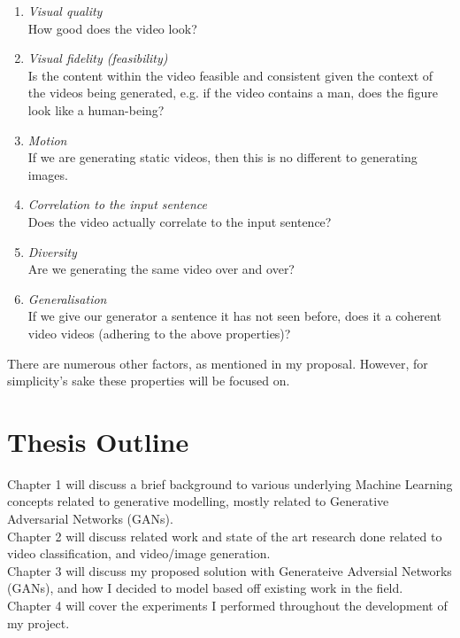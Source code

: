 \documentclass{report}
\theoremstyle{plain}
\theoremstyle{definition}
\theoremstyle{remark}
\numberwithin{equation}{section}
\numberwithin{figure}{section}
\newcommand{\<}{\langle}
\renewcommand{\>}{\rangle}
\begin{document}
\begin{enumerate}
    \item \textit{Visual quality}\\
        How good does the video look?
    \item \textit{Visual fidelity (feasibility)}\\
        Is the content within the video feasible and consistent given the context of the videos being generated, e.g. if the video contains a man, does the figure look like a human-being?
    \item \textit{Motion}\\
        If we are generating static videos, then this is no different to generating images.
    \item \textit{Correlation to the input sentence}\\
        Does the video actually correlate to the input sentence?
    \item \textit{Diversity}\\
        Are we generating the same video over and over? 
    \item \textit{Generalisation}\\
        If we give our generator a sentence it has not seen before, does it a coherent video videos (adhering to the above properties)?
\end{enumerate}

There are numerous other factors, as mentioned in my proposal. However, for simplicity's sake these properties will be focused on.

\section{Thesis Outline}

Chapter 1 will discuss a brief background to various underlying Machine Learning concepts related to generative modelling, mostly related to Generative Adversarial Networks (GANs).\\

\noindent
Chapter 2 will discuss related work and state of the art research done related to video classification, and video/image generation.\\

\noindent
Chapter 3 will discuss my proposed solution with Generateive Adversial Networks (GANs), and how I decided to model based off existing work in the field.\\

\noindent
Chapter 4 will cover the experiments I performed throughout the development of my project.\\
\end{document}
